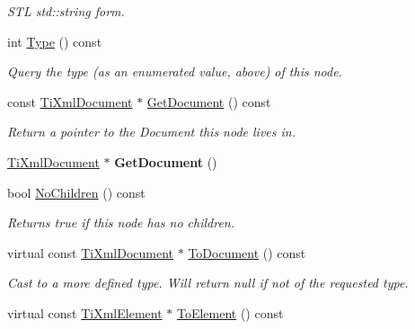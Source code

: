 \begin{DoxyCompactItemize}
\begin{DoxyCompactList}\small\item\em S\+TL std\+::string form. \end{DoxyCompactList}\item 
int \hyperlink{class_ti_xml_node_a57b99d5c97d67a42b9752f5210a1ba5e}{Type} () const 
\begin{DoxyCompactList}\small\item\em Query the type (as an enumerated value, above) of this node. \end{DoxyCompactList}\item 
const \hyperlink{class_ti_xml_document}{Ti\+Xml\+Document} $\ast$ \hyperlink{class_ti_xml_node_aa66f4ebcd175204a168ed7c2d7b43071}{Get\+Document} () const 
\begin{DoxyCompactList}\small\item\em Return a pointer to the Document this node lives in. \end{DoxyCompactList}\item 
\hyperlink{class_ti_xml_document}{Ti\+Xml\+Document} $\ast$ {\bfseries Get\+Document} ()\hypertarget{class_ti_xml_node_a7b2372c0e7adfb32f5b6902fe49a39b2}{}\label{class_ti_xml_node_a7b2372c0e7adfb32f5b6902fe49a39b2}

\item 
bool \hyperlink{class_ti_xml_node_aeed21ad30630ef6e7faf096127edc9f3}{No\+Children} () const \hypertarget{class_ti_xml_node_aeed21ad30630ef6e7faf096127edc9f3}{}\label{class_ti_xml_node_aeed21ad30630ef6e7faf096127edc9f3}

\begin{DoxyCompactList}\small\item\em Returns true if this node has no children. \end{DoxyCompactList}\item 
virtual const \hyperlink{class_ti_xml_document}{Ti\+Xml\+Document} $\ast$ \hyperlink{class_ti_xml_node_a8a4cda4b15c29f64cff419309aebed08}{To\+Document} () const \hypertarget{class_ti_xml_node_a8a4cda4b15c29f64cff419309aebed08}{}\label{class_ti_xml_node_a8a4cda4b15c29f64cff419309aebed08}

\begin{DoxyCompactList}\small\item\em Cast to a more defined type. Will return null if not of the requested type. \end{DoxyCompactList}\item 
virtual const \hyperlink{class_ti_xml_element}{Ti\+Xml\+Element} $\ast$ \hyperlink{class_ti_xml_node_a72abed96dc9667ab9e0a2a275301bb1c}{To\+Element} () const \hypertarget{class_ti_xml_node_a72abed96dc9667ab9e0a2a275301bb1c}{}\label{class_ti_xml_node_a72abed96dc9667ab9e0a2a275301bb1c}


\end{DoxyCompactItemize}

